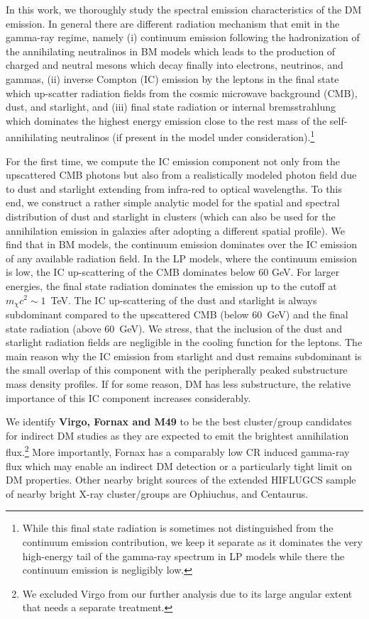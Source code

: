 \documentclass[10pt,aps,pra,reprint,amsmath,amsfonts,amssymb,showpacs,nofootinbib,floatfix]{revtex4-1}
\def\C#1{{\bf #1}}
\begin{document}
In this work, we thoroughly study the spectral emission
characteristics of the DM emission. In general there are different
radiation mechanism that emit in the gamma-ray regime, namely (i)
continuum emission following the hadronization of the annihilating
neutralinos in BM models which leads to the production of charged and
neutral mesons which decay finally into electrons, neutrinos, and
gammas, (ii) inverse Compton (IC) emission by the leptons in the final
state which up-scatter radiation fields from the cosmic microwave
background (CMB), dust, and starlight, and (iii) final state radiation
or internal bremsstrahlung which dominates the highest energy emission
close to the rest mass of the self-annihilating neutralinos (if
present in the model under consideration).\footnote{While this final
  state radiation is sometimes not distinguished from the continuum
  emission contribution, we keep it separate as it dominates the very
  high-energy tail of the gamma-ray spectrum in LP models while there
  the continuum emission is negligibly low.}

For the first time, we compute the IC emission component not only from
the upscattered CMB photons but also from a realistically modeled
photon field due to dust and starlight extending from infra-red to
optical wavelengths. To this end, we construct a rather simple
analytic model for the spatial and spectral distribution of dust and
starlight in clusters (which can also be used for the annihilation
emission in galaxies after adopting a different spatial profile).  We
find that in BM models, the continuum emission dominates over the IC
emission of any available radiation field. In the LP models, where the
continuum emission is low, the IC up-scattering of the CMB dominates
below 60 GeV. For larger energies, the final state radiation dominates
the emission up to the cutoff at $m_\chi c^2 \sim 1$~TeV. The IC
up-scattering of the dust and starlight is always subdominant compared
to the upscattered CMB (below 60~GeV) and the final state radiation
(above 60~GeV).  We stress, that the inclusion of the dust and
starlight radiation fields are negligible in the cooling function for
the leptons.  The main reason why the IC emission from starlight and
dust remains subdominant is the small overlap of this component with
the peripherally peaked substructure mass density profiles. If for
some reason, DM has less substructure, the relative importance of this
IC component increases considerably.

We identify \C{Virgo, Fornax and M49} to be the best cluster/group
candidates for indirect DM studies as they are expected to emit the
brightest annihilation flux.\footnote{We excluded Virgo from our
  further analysis due to its large angular extent that needs a
  separate treatment.}  More importantly, Fornax has a comparably low
CR induced gamma-ray flux which may enable an indirect DM detection or
a particularly tight limit on DM properties.  Other nearby bright
sources of the extended HIFLUGCS sample of nearby bright X-ray
cluster/groups are Ophiuchus, and Centaurus.
\end{document}
